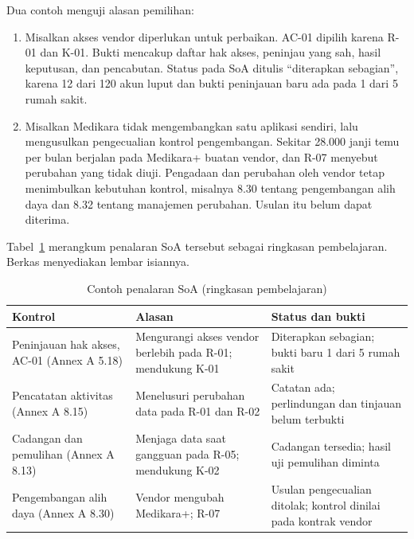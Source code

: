 Dua contoh menguji alasan pemilihan:
\begin{enumerate}
  \item Misalkan akses vendor diperlukan untuk perbaikan. AC-01 dipilih karena R-01 dan K-01. Bukti
  mencakup daftar hak akses, peninjau yang sah, hasil keputusan, dan pencabutan. Status pada SoA
  ditulis ``diterapkan sebagian'', karena 12 dari 120 akun luput dan bukti peninjauan baru ada pada
  1 dari 5 rumah sakit.
  \item Misalkan Medikara tidak mengembangkan satu aplikasi sendiri, lalu mengusulkan pengecualian
  kontrol pengembangan. Sekitar 28.000 janji temu per bulan berjalan pada Medikara+ buatan vendor,
  dan R-07 menyebut perubahan yang tidak diuji. Pengadaan dan perubahan oleh vendor tetap menimbulkan
  kebutuhan kontrol, misalnya 8.30 tentang pengembangan alih daya dan 8.32 tentang manajemen
  perubahan. Usulan itu belum dapat diterima.
\end{enumerate}

Tabel~\ref{tab:ch06-soa} merangkum penalaran SoA tersebut sebagai ringkasan pembelajaran. Berkas
 menyediakan lembar isiannya.

\begin{table}[!htb]
  \centering\small
  \caption{Contoh penalaran SoA (ringkasan pembelajaran)}\label{tab:ch06-soa}
  \begin{tabularx}{\textwidth}{|>{\raggedright\arraybackslash}p{}|>{\raggedright\arraybackslash}X|>{\raggedright\arraybackslash}X|}
    \hline
    \textbf{Kontrol} & \textbf{Alasan} & \textbf{Status dan bukti} \\ \hline
    Peninjauan hak akses, AC-01 (Annex A 5.18) & Mengurangi akses vendor berlebih pada R-01;
    mendukung K-01 & Diterapkan sebagian; bukti baru 1 dari 5 rumah sakit \\ \hline
    Pencatatan aktivitas (Annex A 8.15) & Menelusuri perubahan data pada R-01 dan R-02 & Catatan ada;
    perlindungan dan tinjauan belum terbukti \\ \hline
    Cadangan dan pemulihan (Annex A 8.13) & Menjaga data saat gangguan pada R-05; mendukung K-02 &
    Cadangan tersedia; hasil uji pemulihan diminta \\ \hline
    Pengembangan alih daya (Annex A 8.30) & Vendor mengubah Medikara+; R-07 & Usulan pengecualian
    ditolak; kontrol dinilai pada kontrak vendor \\ \hline
  \end{tabularx}
\end{table}


